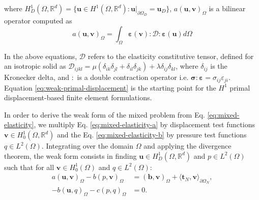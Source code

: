 \documentclass[english,11pt,3p,number,sort&compress]{elsarticle}
\begin{document}
\noindent where $H^1_D(\Omega,\mathbb{R}^d)=\{\bm{u} \in H^1(\Omega,\mathbb{R}^d) : \bm{u} \lvert_{\partial\Omega_D}=\bm{u}_D\}$, $a\left(\bm{u},\bm{v}\right)_\Omega$ is a bilinear operator computed as
\begin{equation*}
	a\left(\bm{u},\bm{v}\right)_\Omega = \int_{\Omega} \bm{\varepsilon}(\bm{v}) : \mathcal{D} : \bm{\varepsilon}(\bm{u}) d\Omega
\end{equation*}

In the above equations, $\mathcal{D}$ refers to the elasticity constitutive tensor, defined for an isotropic solid as $\mathcal{D}_{ijkl} = \mu(\delta_{ik}\delta_{jl}+\delta_{il}\delta_{jk})+\lambda\delta_{ij}\delta_{kl}$, where $\delta_{ij}$ is the Kronecker delta, and $:$ is a double contraction operator i.e. $\bm{\sigma}:\bm{\varepsilon} = \sigma_{ij}\varepsilon_{ji}$. Equation \eqref{eq:weak-primal-displacement} is the starting point for the $H^1$ primal displacement-based finite element formulations.

In order to derive the weak form of the mixed problem from Eq. \eqref{eq:mixed-elasticity}, we multiply Eq. \eqref{eq:mixed-elasticity-a} by displacement test functions $\bm{v} \in H^1_0(\Omega,\mathbb{R}^d)$ and the Eq. \eqref{eq:mixed-elasticity-b} by pressure test functions $q \in L^2(\Omega)$. Integrating over the domain $\Omega$ and applying the divergence theorem, the weak form consists in finding $\bm{u} \in H^1_D(\Omega,\mathbb{R}^d)$ and $p \in L^2(\Omega)$ such that for all $\bm{v} \in H^1_0(\Omega)$ and $q \in L^2(\Omega)$:
\begin{subequations} \label{eq:weak-mixed}
	\begin{align}
		a\left(\bm{u},\bm{v}\right)_\Omega - b\left( p, \bm{v}\right)_\Omega &= \left(\bm{b},\bm{v}\right)_\Omega + \langle\bm{t}_N,\bm{v}\rangle_{\partial\Omega_N} ,\label{eq:weak-mixed-a}\\ 
		-b\left(\bm{u}, q\right)_\Omega - c\left(p,q \right)_\Omega &= 0 . \label{eq:weak-mixed-b}
	\end{align}
\end{subequations}
\end{document}
